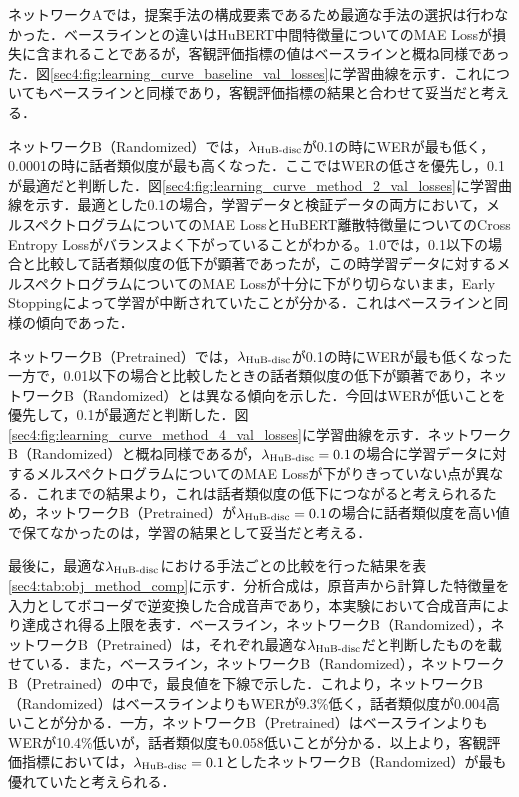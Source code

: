 ネットワークAでは，提案手法の構成要素であるため最適な手法の選択は行わなかった．ベースラインとの違いはHuBERT中間特徴量についてのMAE Lossが損失に含まれることであるが，客観評価指標の値はベースラインと概ね同様であった．図\ref{sec4:fig:learning_curve_baseline_val_losses}に学習曲線を示す．これについてもベースラインと同様であり，客観評価指標の結果と合わせて妥当だと考える．

ネットワークB（Randomized）では，$\lambda_{\text{HuB-disc}}$が0.1の時にWERが最も低く，0.0001の時に話者類似度が最も高くなった．ここではWERの低さを優先し，0.1が最適だと判断した．図\ref{sec4:fig:learning_curve_method_2_val_losses}に学習曲線を示す．最適とした0.1の場合，学習データと検証データの両方において，メルスペクトログラムについてのMAE LossとHuBERT離散特徴量についてのCross Entropy Lossがバランスよく下がっていることがわかる。1.0では，0.1以下の場合と比較して話者類似度の低下が顕著であったが，この時学習データに対するメルスペクトログラムについてのMAE Lossが十分に下がり切らないまま，Early Stoppingによって学習が中断されていたことが分かる．これはベースラインと同様の傾向であった．

ネットワークB（Pretrained）では，$\lambda_{\text{HuB-disc}}$が0.1の時にWERが最も低くなった一方で，0.01以下の場合と比較したときの話者類似度の低下が顕著であり，ネットワークB（Randomized）とは異なる傾向を示した．今回はWERが低いことを優先して，0.1が最適だと判断した．図\ref{sec4:fig:learning_curve_method_4_val_losses}に学習曲線を示す．ネットワークB（Randomized）と概ね同様であるが，$\lambda_{\text{HuB-disc}} = 0.1$の場合に学習データに対するメルスペクトログラムについてのMAE Lossが下がりきっていない点が異なる．これまでの結果より，これは話者類似度の低下につながると考えられるため，ネットワークB（Pretrained）が$\lambda_{\text{HuB-disc}} = 0.1$の場合に話者類似度を高い値で保てなかったのは，学習の結果として妥当だと考える．

最後に，最適な$\lambda_{\text{HuB-disc}}$における手法ごとの比較を行った結果を表\ref{sec4:tab:obj_method_comp}に示す．分析合成は，原音声から計算した特徴量を入力としてボコーダで逆変換した合成音声であり，本実験において合成音声により達成され得る上限を表す．ベースライン，ネットワークB（Randomized），ネットワークB（Pretrained）は，それぞれ最適な$\lambda_{\text{HuB-disc}}$だと判断したものを載せている．また，ベースライン，ネットワークB（Randomized），ネットワークB（Pretrained）の中で，最良値を下線で示した．これより，ネットワークB（Randomized）はベースラインよりもWERが9.3\%低く，話者類似度が0.004高いことが分かる．一方，ネットワークB（Pretrained）はベースラインよりもWERが10.4\%低いが，話者類似度も0.058低いことが分かる．以上より，客観評価指標においては，$\lambda_{\text{HuB-disc}} = 0.1$としたネットワークB（Randomized）が最も優れていたと考えられる．

